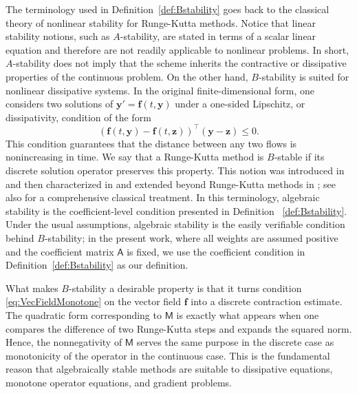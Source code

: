 \documentclass{amsart}
\newcommand{\msfA}{\mathsf{A}}
\newcommand{\msfM}{\mathsf{M}}
\newcommand{\bff}{\boldsymbol{f}}
\newcommand{\bfy}{\boldsymbol{y}}
\newcommand{\bfz}{\boldsymbol{z}}
\theoremstyle{definition}
\newcommand{\AJS}[1]{#1}
\begin{document}

The terminology used in Definition~\ref{def:Bstability} goes back to the classical theory of nonlinear stability for Runge-Kutta methods. Notice that linear stability notions, such as $A$-stability, are stated in terms of a scalar linear equation and therefore are not readily applicable to nonlinear problems. In short, $A$-stability does not imply that the scheme inherits the contractive or dissipative properties of the continuous problem. On the other hand, $B$-stability is suited for nonlinear dissipative systems. In the original finite-dimensional form, one considers two solutions of $\bfy' = \AJS{\bff}(t,\bfy)$ under a one-sided Lipschitz, or dissipativity, condition of the form
\begin{equation}
\label{eq:VecFieldMonotone}
  (\AJS{\bff}(t,\bfy)-\AJS{\bff}(t,\bfz))^\top(\bfy-\bfz) \leq 0.
\end{equation}
This condition guarantees that the distance between any two flows is nonincreasing in time. We say that a Runge-Kutta method is $B$-stable if its discrete solution operator preserves this property. This notion was introduced in \cite{butcher1975stability} and then characterized in \cite{MR525638,MR518683} and extended beyond Runge-Kutta methods in \cite{burrage1980non}; see also \cite[Section IV.12]{MR2657217} for a comprehensive classical treatment. In this terminology, algebraic stability is the coefficient-level condition presented in Definition ~\ref{def:Bstability}. Under the usual assumptions, algebraic stability is the easily verifiable condition behind $B$-stability; in the present work, where all weights are assumed positive and the coefficient matrix $\msfA$ is fixed, we use the coefficient condition in Definition~\ref{def:Bstability} as our definition.

What makes $B$-stability a desirable property is that it turns condition \eqref{eq:VecFieldMonotone} on the vector field \AJS{$\bff$} into a discrete contraction estimate. The quadratic form corresponding to $\msfM$ is exactly what appears when one compares the difference of two Runge-Kutta steps and expands the squared norm. Hence, the \AJS{nonnegativity} of $\msfM$ serves the same purpose in the discrete case as monotonicity of the operator in the continuous case. This is the fundamental reason that algebraically stable methods are suitable to dissipative equations, monotone operator equations, and gradient problems.
\end{document}

